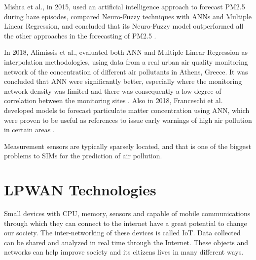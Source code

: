 Mishra et al., in 2015, used an artificial intelligence approach to forecast PM2.5 during haze episodes, compared Neuro-Fuzzy techniques with ANNs and Multiple Linear Regression, and concluded that its Neuro-Fuzzy model outperformed all the other approaches in the forecasting of PM2.5 \cite{Mishra2015}.

In 2018, Alimissis et al., evaluated both ANN and Multiple Linear Regression as interpolation methodologies, using data from a real urban air quality monitoring network of the concentration of different air pollutants in Athens, Greece. It was concluded that ANN were significantly better, especially where the monitoring network density was limited and there was consequently a low degree of correlation between the monitoring sites \cite{Alimissis2018}. Also in 2018, Franceschi et al. developed models to forecast particulate matter concentration using ANN, which were proven to be useful as references to issue early warnings of high air pollution in certain areas \cite{Franceschi2018}.

Measurement sensors are typically sparsely located, and that is one of the biggest problems to SIMs for the prediction of air pollution.



\section{LPWAN Technologies}

Small devices with \ac{CPU}, memory, sensors and capable of mobile communications through which they can connect to the internet have a great potential to change our society. The inter-networking of these devices is called IoT. Data collected can be shared and analyzed in real time through the Internet. These objects and networks can help improve society and its citizens lives in many different ways.

